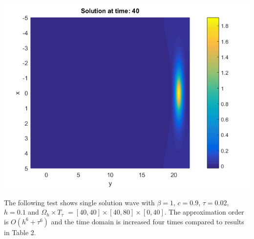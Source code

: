 \documentclass[a0,portrait]{a0poster}
\begin{document}
\begin{multicols}{2}
\begin{center}
\begin{minipage}[b]{0.30\linewidth}
		 \includegraphics[width=\linewidth]{figures/Solution_bt3_t=40.png}
	\end{minipage}
\end{center}\vspace{0.4cm}
The following test shows single solution wave with $\beta = 1$, $c = 0.9$, $\tau = 0.02$, $h = 0.1$ and $\Omega_h \times T_{\tau}$ $= [40, 40] \times [40, 80] \times [0, 40]$. The approximation order is $O(h^6 + \tau^6)$ and the time domain is increased four times compared to results in Table 2.


\end{multicols}
\end{document}
